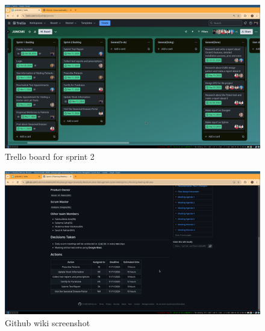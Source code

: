 \documentclass[a4paper,12pt]{article}
\begin{document}
\begin{figure}[H]
    \centering
    \includegraphics[width=1\textwidth]{images/spr2plan2.png}   
    \caption{Trello board for sprint 2}
    \label{fig:spr2plan2}
\end{figure}
\begin{figure}[H]
    \centering
    \includegraphics[width=1\textwidth]{images/spr2plan3.png}   
    \caption{Github wiki screenshot}
    \label{fig:spr2plan3}
\end{figure}
\newpage
\end{document}
